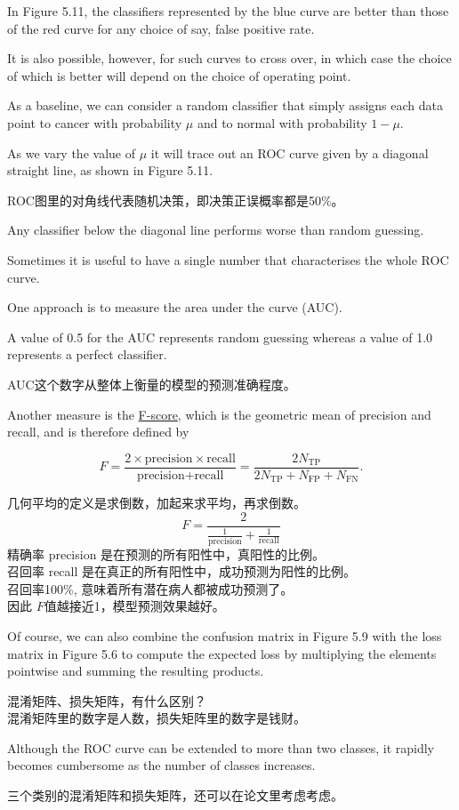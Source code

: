 \documentclass{article}
\begin{document}
In Figure 5.11, the classifiers represented by the blue curve are better than those of the red curve for any choice of say, false positive rate. 

It is also possible, however, for such curves to cross over, in which case the choice of which is better will depend on the choice of operating point.

As a baseline, we can consider a random classifier that simply assigns each data point to cancer with probability $\mu$ and to normal with probability $1-\mu$. 

As we vary the value of $\mu$ it will trace out an ROC curve given by a diagonal straight line, as shown in Figure 5.11. 

{\color{red}
ROC图里的对角线代表随机决策，即决策正误概率都是50\%。
}

Any classifier below the diagonal line performs worse than random guessing.


Sometimes it is useful to have a single number that characterises the whole ROC curve. 

One approach is to measure the area under the curve (AUC). 

A value of 0.5 for the AUC represents random guessing whereas a value of 1.0 represents a perfect classifier.

{\color{red}
AUC这个数字从整体上衡量的模型的预测准确程度。
}

Another measure is the \underline{\color{red}F-score}, which is the geometric mean of precision and recall, and is therefore defined by

\begin{equation}
F = \frac{2\times\text{precision}\times\text{recall}}{\text{precision}+\text{recall}} = \frac{2N_{\text{TP}}}{2N_{\text{TP}}+N_{\text{FP}}+N_{\text{FN}}}.
\tag{5.38, 5.39}
\end{equation}

{\color{red}
几何平均的定义是求倒数，加起来求平均，再求倒数。
\begin{equation*}
F = \frac{2}{\frac{1}{\text{precision}} + \frac{1}{\text{recall}}}
\end{equation*}
精确率 precision 是在预测的所有阳性中，真阳性的比例。\\
召回率 recall 是在真正的所有阳性中，成功预测为阳性的比例。\\
召回率100\%, 意味着所有潜在病人都被成功预测了。\\
因此 $F$值越接近1，模型预测效果越好。
}

Of course, we can also combine the confusion matrix in Figure 5.9 with the loss matrix in Figure 5.6 to compute the expected loss by multiplying the elements pointwise and summing the resulting products.

{\color{red}
混淆矩阵、损失矩阵，有什么区别？\\
混淆矩阵里的数字是人数，损失矩阵里的数字是钱财。
}

Although the ROC curve can be extended to more than two classes, it rapidly becomes cumbersome as the number of classes increases.

{\color{red}
三个类别的混淆矩阵和损失矩阵，还可以在论文里考虑考虑。
}
\end{document}
